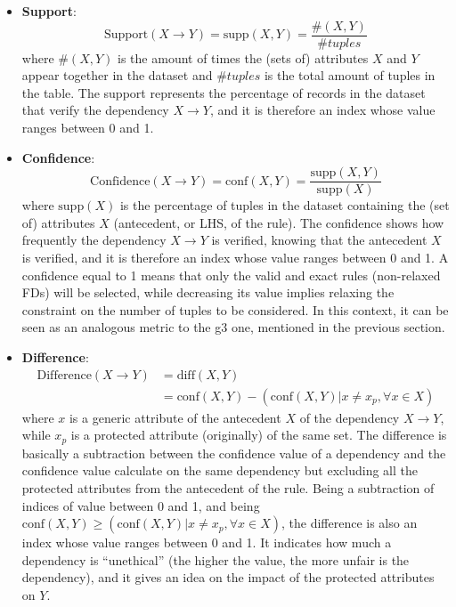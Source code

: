 \begin{itemize}
\item \textbf{Support}: \[\mathrm{Support}(X \rightarrow Y) = \mathrm{supp}(X, Y) = \frac{\#(X, Y)}{\mathit{\#tuples}}\] where \(\#(X, Y)\) is the amount of times the (sets of) attributes \(X\) and \(Y\) appear together in the dataset and \(\#tuples\) is the total amount of tuples in the table. The support represents the percentage of records in the dataset that verify the dependency \(X \rightarrow Y\), and it is therefore an index whose value ranges between 0 and 1.
\item \textbf{Confidence}: \[\mathrm{Confidence}(X \rightarrow Y) = \mathrm{conf}(X, Y) = \frac{\mathrm{supp}(X, Y)}{\mathrm{supp}(X)}\] where \(\mathrm{supp}(X)\) is the percentage of tuples in the dataset containing the (set of) attributes \(X\) (antecedent, or LHS, of the rule). The confidence shows how frequently the dependency \(X \rightarrow Y\) is verified, knowing that the antecedent \(X\) is verified, and it is therefore an index whose value ranges between 0 and 1. A confidence equal to 1 means that only the valid and exact rules (non-relaxed FDs) will be selected, while decreasing its value implies relaxing the constraint on the number of tuples to be considered. In this context, it can be seen as an analogous metric to the g3 one, mentioned in the previous section.
\item \textbf{Difference}:
\begin{align*}
\mathrm{Difference}(X \rightarrow Y) &= \mathrm{diff}(X, Y) \\
&= \mathrm{conf}(X, Y) - (\mathrm{conf}(X, Y) | x \neq x_p, \forall x \in X)
\end{align*}
where \(x\) is a generic attribute of the antecedent \(X\) of the dependency \(X \rightarrow Y\), while \(x_p\) is a protected attribute (originally) of the same set. The difference is basically a subtraction between the confidence value of a dependency and the confidence value calculate on the same dependency but excluding all the protected attributes from the antecedent of the rule. Being a subtraction of indices of value between 0 and 1, and being \(\mathrm{conf}(X, Y) \geq (\mathrm{conf}(X, Y) | x \neq x_p, \forall x \in X)\), the difference is also an index whose value ranges between 0 and 1. It indicates how much a dependency is ``unethical'' (the higher the value, the more unfair is the dependency), and it gives an idea on the impact of the protected attributes on \(Y\).
\end{itemize}


